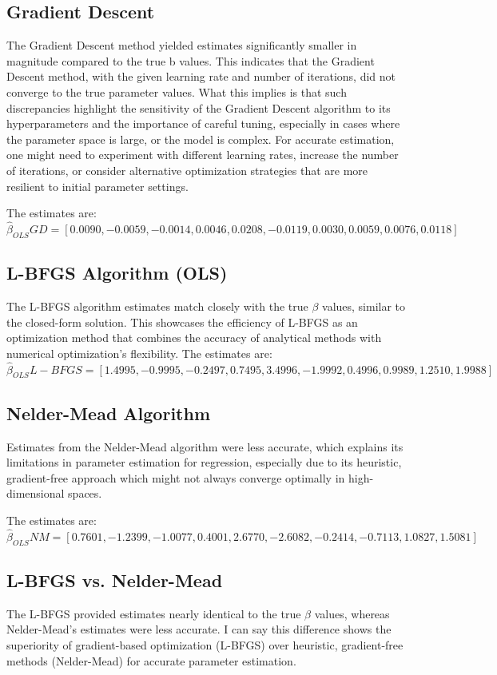 \documentclass[12pt]{article}
\begin{document}
\subsection{Gradient Descent}
The Gradient Descent method yielded estimates significantly smaller in magnitude compared to the true b values. This indicates that the Gradient Descent method, with the given learning rate and number of iterations, did not converge to the true parameter values.
What this implies is that such discrepancies highlight the sensitivity of the Gradient Descent algorithm to its hyperparameters and the importance of careful tuning, especially in cases where the parameter space is large, or the model is complex. For accurate estimation, one might need to experiment with different learning rates, increase the number of iterations, or consider alternative optimization strategies that are more resilient to initial parameter settings.

The estimates are:
\[ \hat{\beta}_{OLS} GD = [0.0090, -0.0059, -0.0014, 0.0046, 0.0208, -0.0119, 0.0030, 0.0059, 0.0076, 0.0118] \]


\subsection{L-BFGS Algorithm (OLS)}
  The L-BFGS algorithm estimates match closely with the true $\beta$ values, similar to the closed-form solution. This showcases the efficiency of L-BFGS as an optimization method that combines the accuracy of analytical methods with numerical optimization's flexibility.
The estimates are:
\[ \hat{\beta}_{OLS} L-BFGS= [1.4995, -0.9995, -0.2497, 0.7495, 3.4996, -1.9992, 0.4996, 0.9989, 1.2510, 1.9988] \]

\subsection{Nelder-Mead Algorithm}
 Estimates from the Nelder-Mead algorithm were less accurate, which explains its limitations in parameter estimation for regression, especially due to its heuristic, gradient-free approach which might not always converge optimally in high-dimensional spaces.

The estimates are:
\[ \hat{\beta}_{OLS} NM= [0.7601, -1.2399, -1.0077, 0.4001, 2.6770, -2.6082, -0.2414, -0.7113, 1.0827, 1.5081] \]

\subsection{L-BFGS vs. Nelder-Mead}
The L-BFGS provided estimates nearly identical to the true $\beta$ values, whereas Nelder-Mead's estimates were less accurate. I can say this difference shows the superiority of gradient-based optimization (L-BFGS) over heuristic, gradient-free methods (Nelder-Mead) for accurate parameter estimation.
\end{document}
